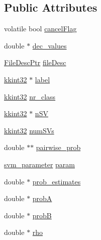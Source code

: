\subsection*{Public Attributes}
\begin{DoxyCompactItemize}
\item 
volatile bool \hyperlink{struct_s_v_m289___m_f_s_1_1_svm___model_a01645368f6800875543d69ce8731d692}{cancel\+Flag}
\item 
double $\ast$ \hyperlink{struct_s_v_m289___m_f_s_1_1_svm___model_a246da513040f5a6ab8c7cdd9dbf442f6}{dec\+\_\+values}
\item 
\hyperlink{namespace_k_k_m_l_l_aa0d0b6ab4ec18868a399b8455b05d914}{File\+Desc\+Ptr} \hyperlink{struct_s_v_m289___m_f_s_1_1_svm___model_a60df40219f6193cae58891193aa1f44d}{file\+Desc}
\item 
\hyperlink{namespace_k_k_b_a8fa4952cc84fda1de4bec1fbdd8d5b1b}{kkint32} $\ast$ \hyperlink{struct_s_v_m289___m_f_s_1_1_svm___model_a2f46b2e4f808a25c5f4d15e65c988872}{label}
\item 
\hyperlink{namespace_k_k_b_a8fa4952cc84fda1de4bec1fbdd8d5b1b}{kkint32} \hyperlink{struct_s_v_m289___m_f_s_1_1_svm___model_a0cf11115996187369bc6152f30f6e64c}{nr\+\_\+class}
\item 
\hyperlink{namespace_k_k_b_a8fa4952cc84fda1de4bec1fbdd8d5b1b}{kkint32} $\ast$ \hyperlink{struct_s_v_m289___m_f_s_1_1_svm___model_a99c49e2824661c212c1599dcd636d2c0}{n\+SV}
\item 
\hyperlink{namespace_k_k_b_a8fa4952cc84fda1de4bec1fbdd8d5b1b}{kkint32} \hyperlink{struct_s_v_m289___m_f_s_1_1_svm___model_a9d1cb317006096158440daf45c809f0c}{num\+S\+Vs}
\item 
double $\ast$$\ast$ \hyperlink{struct_s_v_m289___m_f_s_1_1_svm___model_a56bfa09257711ad80e18c3813a515fed}{pairwise\+\_\+prob}
\item 
\hyperlink{struct_s_v_m289___m_f_s_1_1svm__parameter}{svm\+\_\+parameter} \hyperlink{struct_s_v_m289___m_f_s_1_1_svm___model_af44a309facec24212604b219dc411582}{param}
\item 
double $\ast$ \hyperlink{struct_s_v_m289___m_f_s_1_1_svm___model_af9f2c576c765f5d622dd7bc55454883c}{prob\+\_\+estimates}
\item 
double $\ast$ \hyperlink{struct_s_v_m289___m_f_s_1_1_svm___model_ae32212566d46d6d9cafbddd37dcfbada}{probA}
\item 
double $\ast$ \hyperlink{struct_s_v_m289___m_f_s_1_1_svm___model_a4849dabb9dde1adde990980c6c7e1737}{probB}
\item 
double $\ast$ \hyperlink{struct_s_v_m289___m_f_s_1_1_svm___model_ac6ee5562a25222e436bb29497cc98525}{rho}
$$
\end{DoxyCompactItemize}
